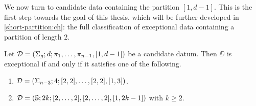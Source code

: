 We now turn to candidate data containing the partition $[1,d-1]$. This is the first step towards the goal of this thesis, which will be further developed in \cref{short-partition:ch}: the full classification of exceptional data containing a partition of length $2$.

\begin{proposition}\label{monodromy:th:sphere-[1 d-1]}
Let $\mathcal{D}=(\Sigma_{g};d;\pi_1,\ldots,\pi_{n-1},[1,d-1])$ be a candidate datum. Then $\DD$ is exceptional if and only if it satisfies one of the following.
\begin{enumerate}[(1)]
\item $\mathcal{D}=(\Sigma_{n-3};4;[2,2],\ldots,[2,2],[1,3])$.
\item $\mathcal{D}=(\mathbb{S}{};2k;[2,\ldots,2],[2,\ldots,2],[1,2k-1])$ with $k\ge 2$.
\end{enumerate}
\end{proposition}
